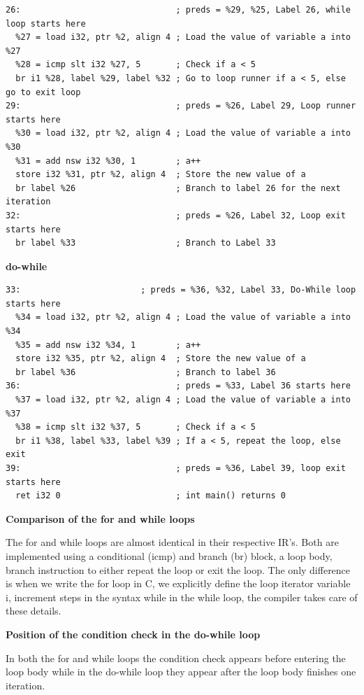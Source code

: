 \documentclass[11pt,a4paper]{article}
\begin{document}
\begin{lstlisting}
26:                               ; preds = %29, %25, Label 26, while loop starts here
  %27 = load i32, ptr %2, align 4 ; Load the value of variable a into %27
  %28 = icmp slt i32 %27, 5       ; Check if a < 5
  br i1 %28, label %29, label %32 ; Go to loop runner if a < 5, else go to exit loop
29:                               ; preds = %26, Label 29, Loop runner starts here
  %30 = load i32, ptr %2, align 4 ; Load the value of variable a into %30
  %31 = add nsw i32 %30, 1        ; a++
  store i32 %31, ptr %2, align 4  ; Store the new value of a
  br label %26                    ; Branch to label 26 for the next iteration
32:                               ; preds = %26, Label 32, Loop exit starts here
  br label %33                    ; Branch to Label 33
\end{lstlisting}

\textbf{do-while}


\begin{lstlisting}
33:                        ; preds = %36, %32, Label 33, Do-While loop starts here
  %34 = load i32, ptr %2, align 4 ; Load the value of variable a into %34
  %35 = add nsw i32 %34, 1        ; a++
  store i32 %35, ptr %2, align 4  ; Store the new value of a
  br label %36                    ; Branch to label 36
36:                               ; preds = %33, Label 36 starts here
  %37 = load i32, ptr %2, align 4 ; Load the value of variable a into %37
  %38 = icmp slt i32 %37, 5       ; Check if a < 5
  br i1 %38, label %33, label %39 ; If a < 5, repeat the loop, else exit
39:                               ; preds = %36, Label 39, loop exit starts here
  ret i32 0                       ; int main() returns 0
\end{lstlisting}

\textbf{Comparison of the for and while loops}


The for and while loops are almost identical in their respective IR's. Both are implemented using a conditional (icmp) and branch (br) block, a loop body, branch instruction to either repeat the loop or exit the loop. The only difference is when we write the for loop in C, we explicitly define the loop iterator variable i, increment steps in the syntax while in the while loop, the compiler takes care of these details.


\textbf{Position of the condition check in the do-while loop}


In both the for and while loops the condition check appears before entering the loop body while in the do-while loop they appear after the loop body finishes one iteration.
\end{document}
